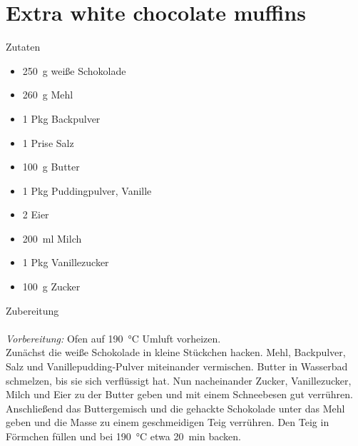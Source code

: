 \section*{Extra white chocolate muffins}
\ihead{}\ohead{}
\cfoot{}
{\Large Zutaten}
\begin{multicols}{2}
\begin{itemize}
    \item \SI{250}{g} weiße Schokolade
    \item \SI{260}{g} Mehl
    \item \num{1} Pkg Backpulver
    \item \num{1} Prise Salz
    \item \SI{100}{g} Butter
    \item \num{1} Pkg Puddingpulver, Vanille
    \item \num{2} Eier
    \item \SI{200}{ml} Milch
    \item \num{1} Pkg Vanillezucker
    \item \SI{100}{g} Zucker
\end{itemize}
\end{multicols}
\noindent
{\Large Zubereitung}\\
\\
\textit{Vorbereitung:} Ofen auf \SI{190}{\celsius} Umluft vorheizen.\\
Zunächst die weiße Schokolade in kleine Stückchen hacken.
Mehl, Backpulver, Salz und Vanillepudding-Pulver miteinander vermischen.
Butter in Wasserbad schmelzen, bis sie sich verflüssigt hat.
Nun nacheinander Zucker, Vanillezucker, Milch und Eier zu der Butter geben und mit einem Schneebesen gut verrühren.
Anschließend das Buttergemisch und die gehackte Schokolade unter das Mehl geben und die Masse zu einem geschmeidigen Teig verrühren.
Den Teig in Förmchen füllen und bei \SI{190}{\celsius} etwa \SI{20}{min} backen.
